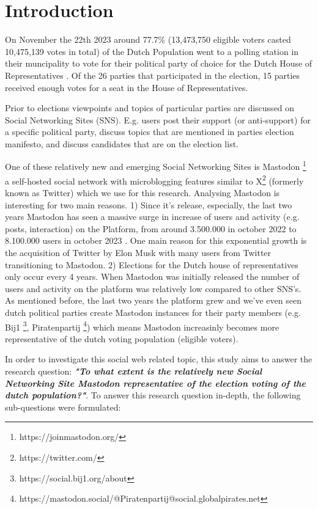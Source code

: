 \section{Introduction}

On November the 22th 2023 around 77.7\% (13,473,750 eligible voters casted 10,475,139 votes in total) of the Dutch Population went to a polling station in their muncipality to vote for their political party of choice for the Dutch House of Representatives \cite{kies}. Of the 26 parties that participated in the election, 15 parties received enough votes for a seat in the House of Representatives.

Prior to elections viewpoints and topics of particular parties are discussed on Social Networking Sites (SNS). E.g. users post their support (or anti-support) for a specific political party, discuss topics that are mentioned in parties election manifesto, and discuss candidates that are on the election list.

One of these relatively new and emerging Social Networking Sites is Mastodon \footnote{https://joinmastodon.org/} a self-hosted social network with microblogging features similar to X\footnote{https://twitter.com/} (formerly known as Twitter) which we use for this research. Analysing Mastodon is interesting for two main reasons. 1) Since it's release, especially, the last two years Mastodon has seen a massive surge in increase of users and activity (e.g. posts, interaction) on the Platform, from around 3.500.000 in october 2022 to 8.100.000 users in october 2023 \cite{analytics}. One main reason for this exponential growth is the acquisition of Twitter by Elon Musk \cite{musk} with many users from Twitter transitioning to Mastodon. 2) Elections for the Dutch house of representatives only occur every 4 years. When Mastodon was initially released the number of users and activity on the platform was relatively low compared to other SNS's. As mentioned before, the last two years the platform grew and we've even seen dutch political parties create Mastodon instances for their party members (e.g. Bij1 \footnote{https://social.bij1.org/about}, Piratenpartij \footnote{https://mastodon.social/@Piratenpartij@social.globalpirates.net}) which means Mastodon increasinly becomes more representative of the dutch voting population (eligible voters).

In order to investigate this social web related topic, this study aims to answer the research question:
\textbf{\textit{"To what extent is the relatively new Social Networking Site Mastodon representative of the election voting of the dutch population?"}}. To answer this research question in-depth, the following sub-questions were formulated:

